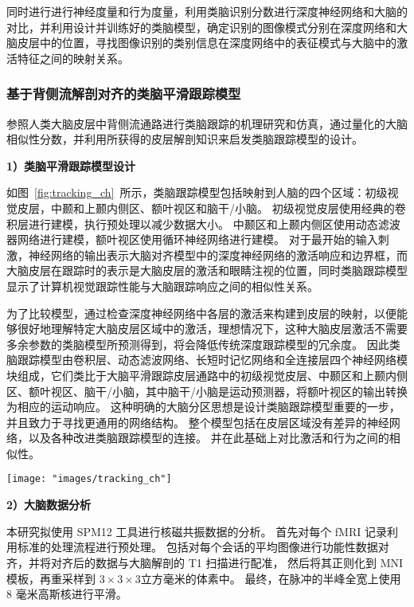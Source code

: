 \documentclass[a4paper,zihao=-4]{article}
\begin{document}
同时进行进行神经度量和行为度量，利用类脑识别分数进行深度神经网络和大脑的对比，并利用设计并训练好的类脑模型，确定识别的图像模式分别在深度网络和大脑皮层中的位置，寻找图像识别的类别信息在深度网络中的表征模式与大脑中的激活特征之间的映射关系。




\subsubsection{基于背侧流解剖对齐的类脑平滑跟踪模型}


参照人类大脑皮层中背侧流通路进行类脑跟踪的机理研究和仿真，通过量化的大脑相似性分数，并利用所获得的皮层解剖知识来启发类脑跟踪模型的设计。

\textbf{1）类脑平滑跟踪模型设计}

如图~\ref{fig:tracking_ch}~所示，类脑跟踪模型包括映射到人脑的四个区域：初级视觉皮层，中颞和上颞内侧区、额叶视区和脑干/小脑。
初级视觉皮层使用经典的卷积层进行建模，执行预处理以减少数据大小。
中颞区和上颞内侧区使用动态滤波器网络进行建模，额叶视区使用循环神经网络进行建模。
对于最开始的输入刺激，神经网络的输出表示大脑对齐模型中的深度神经网络的激活响应和边界框，而大脑皮层在跟踪时的表示是大脑皮层的激活和眼睛注视的位置，同时类脑跟踪模型显示了计算机视觉跟踪性能与大脑跟踪响应之间的相似性关系。

为了比较模型，通过检查深度神经网络中各层的激活来构建到皮层的映射，以便能够很好地理解特定大脑皮层区域中的激活，理想情况下，这种大脑皮层激活不需要多余参数的类脑模型所预测得到，将会降低传统深度跟踪模型的冗余度。
因此类脑跟踪模型由卷积层、动态滤波网络、长短时记忆网络和全连接层四个神经网络模块组成，它们类比于大脑平滑跟踪皮层通路中的初级视觉皮层、中颞区和上颞内侧区、额叶视区、脑干/小脑，其中脑干/小脑是运动预测器，将额叶视区的输出转换为相应的运动响应。
这种明确的大脑分区思想是设计类脑跟踪模型重要的一步，并且致力于寻找更通用的网络结构。
整个模型包括在皮层区域没有差异的神经网络，以及各种改进类脑跟踪模型的连接。
并在此基础上对比激活和行为之间的相似性。

\begin{figure*}[htb!]
	\centering  
	{\texttt{[image: "images/tracking\_ch"]}
	}
	\caption{基于大脑皮层解剖对齐的类脑跟踪模型的架构图}
	\label{fig:tracking_ch}
\end{figure*}


\textbf{2）大脑数据分析}

本研究拟使用 SPM12 工具进行核磁共振数据的分析。
首先对每个 fMRI 记录利用标准的处理流程进行预处理。
包括对每个会话的平均图像进行功能性数据对齐，并将对齐后的数据与大脑解剖的 T1 扫描进行配准，
然后将其正则化到 MNI 模板，再重采样到 $3 \times 3 \times 3$立方毫米的体素中。
最终，在脉冲的半峰全宽上使用 8 毫米高斯核进行平滑。
\end{document}
